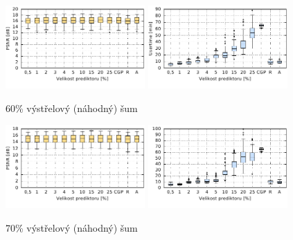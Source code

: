 \begin{figure}[H]
    \centering
    \includegraphics[width=0.475\textwidth]{fig/plot/compare/impulse60-100kg-psnrtest.pdf}
    \hskip0.5cm
    \includegraphics[width=0.475\textwidth]{fig/plot/compare/impulse60-100kg-usertime.pdf}
    \caption{60\% výstřelový (náhodný) šum}
\end{figure}

\begin{figure}[H]
    \centering
    \includegraphics[width=0.475\textwidth]{fig/plot/compare/impulse70-100kg-psnrtest.pdf}
    \hskip0.5cm
    \includegraphics[width=0.475\textwidth]{fig/plot/compare/impulse70-100kg-usertime.pdf}
    \caption{70\% výstřelový (náhodný) šum}
\end{figure}

